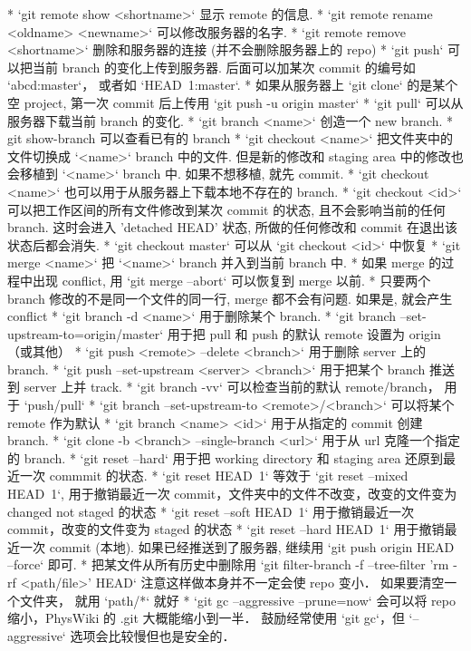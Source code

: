 * `git remote show <shortname>` 显示 remote 的信息.
* `git remote rename <oldname> <newname>` 可以修改服务器的名字.
* `git remote remove <shortname>` 删除和服务器的连接 (并不会删除服务器上的 repo)
* `git push` 可以把当前 branch 的变化上传到服务器. 后面可以加某次 commit 的编号如 `abcd:master`， 或者如 `HEAD~1:master`.
* 如果从服务器上 `git clone` 的是某个空 project, 第一次 commit 后上传用 `git push -u origin master`
* `git pull` 可以从服务器下载当前 branch 的变化.
* `git branch <name>` 创造一个 new branch.
* git show-branch 可以查看已有的 branch
* `git checkout <name>` 把文件夹中的文件切换成 `<name>` branch 中的文件. 但是新的修改和 staging area 中的修改也会移植到 `<name>` branch 中. 如果不想移植, 就先 commit.
* `git checkout <name>` 也可以用于从服务器上下载本地不存在的 branch.
* `git checkout <id>` 可以把工作区间的所有文件修改到某次 commit 的状态, 且不会影响当前的任何 branch. 这时会进入 'detached HEAD' 状态, 所做的任何修改和 commit 在退出该状态后都会消失.
* `git checkout master` 可以从 `git checkout <id>` 中恢复
* `git merge <name>` 把 `<name>` branch 并入到当前 branch 中.
* 如果 merge 的过程中出现 conflict, 用 `git merge --abort` 可以恢复到 merge 以前.
* 只要两个 branch 修改的不是同一个文件的同一行, merge 都不会有问题. 如果是, 就会产生 conflict
* `git branch -d <name>` 用于删除某个 branch.
* `git branch --set-upstream-to=origin/master` 用于把 pull 和 push 的默认 remote 设置为 origin （或其他）
* `git push <remote> --delete <branch>` 用于删除 server 上的 branch.
* `git push --set-upstream <server> <branch>` 用于把某个 branch 推送到 server 上并 track.
* `git branch -vv` 可以检查当前的默认 remote/branch， 用于 `push/pull`
* `git branch --set-upstream-to <remote>/<branch>` 可以将某个 remote 作为默认
* `git branch <name> <id>` 用于从指定的 commit 创建 branch.
* `git clone -b <branch> --single-branch <url>` 用于从 url 克隆一个指定的 branch.
* `git reset --hard` 用于把 working directory 和 staging area 还原到最近一次 commmit 的状态.
* `git reset HEAD~1` 等效于 `git reset --mixed HEAD~1`, 用于撤销最近一次 commit，文件夹中的文件不改变，改变的文件变为 changed not staged 的状态
* `git reset --soft HEAD~1` 用于撤销最近一次 commit，改变的文件变为 staged 的状态
* `git reset --hard HEAD~1` 用于撤销最近一次 commit (本地). 如果已经推送到了服务器, 继续用 `git push origin HEAD --force` 即可.
* 把某文件从所有历史中删除用 `git filter-branch -f --tree-filter 'rm -rf <path/file>' HEAD` 注意这样做本身并不一定会使 repo 变小． 如果要清空一个文件夹， 就用 `path/*` 就好
* `git gc --aggressive --prune=now` 会可以将 repo 缩小，PhysWiki 的 .git 大概能缩小到一半． 鼓励经常使用 `git gc`，但 `--aggressive` 选项会比较慢但也是安全的．
